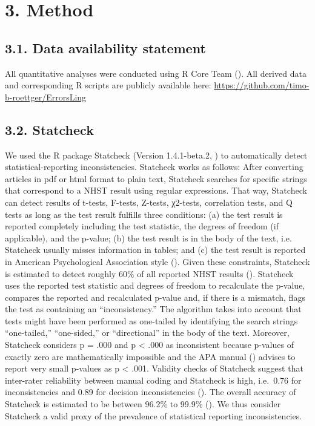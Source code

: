 \documentclass[
  doc,
  longtable,
  nolmodern,
  notxfonts,
  notimes,
  colorlinks=true,linkcolor=blue,citecolor=blue,urlcolor=blue]{apa7}
\begin{document}
\section{3. Method}\label{method}

\subsection{3.1. Data availability
statement}\label{data-availability-statement}

All quantitative analyses were conducted using R Core Team
(). All derived data and corresponding R
scripts are publicly available here:
\url{https://github.com/timo-b-roettger/ErrorsLing}

\subsection{3.2. Statcheck}\label{statcheck}

We used the R package Statcheck (Version 1.4.1-beta.2,
) to
automatically detect statistical-reporting inconsistencies. Statcheck
works as follows: After converting articles in pdf or html format to
plain text, Statcheck searches for specific strings that correspond to a
NHST result using regular expressions. That way, Statcheck can detect
results of t-tests, F-tests, Z-tests, χ2-tests, correlation tests, and Q
tests as long as the test result fulfills three conditions: (a) the test
result is reported completely including the test statistic, the degrees
of freedom (if applicable), and the p-value; (b) the test result is in
the body of the text, i.e. Statcheck usually misses information in
tables; and (c) the test result is reported in American Psychological
Association style (). Given these constraints, Statcheck is estimated to
detect roughly 60\% of all reported NHST results
(). Statcheck
uses the reported test statistic and degrees of freedom to recalculate
the p-value, compares the reported and recalculated p-value and, if
there is a mismatch, flags the test as containing an ``inconsistency.''
The algorithm takes into account that tests might have been performed as
one-tailed by identifying the search strings ``one-tailed,''
``one-sided,'' or ``directional'' in the body of the text. Moreover,
Statcheck considers p = .000 and p \textless{} .000 as inconsistent
because p-values of exactly zero are mathematically impossible and the
APA manual () advises to report very small p-values as p \textless{} .001.
Validity checks of Statcheck suggest that inter-rater reliability
between manual coding and Statcheck is high, i.e.~0.76 for
inconsistencies and 0.89 for decision inconsistencies
(). The
overall accuracy of Statcheck is estimated to be between 96.2\% to
99.9\% (). We
thus consider Statcheck a valid proxy of the prevalence of statistical
reporting inconsistencies.
\end{document}
